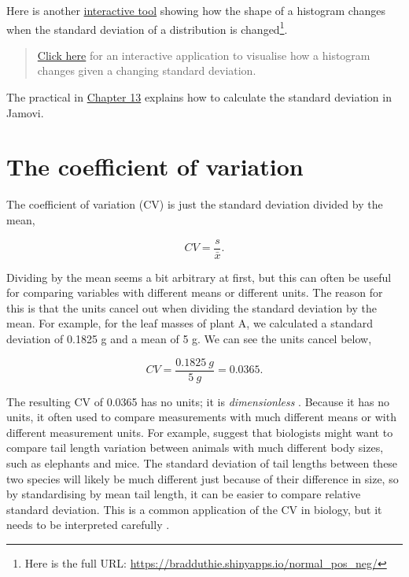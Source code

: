 \documentclass[
]{scrbook}
\begin{document}
Here is another \href{https://bradduthie.shinyapps.io/normal_pos_neg/}{interactive tool} showing how the shape of a histogram changes when the standard deviation of a distribution is changed\footnote{Here is the full URL: \url{https://bradduthie.shinyapps.io/normal_pos_neg/}}.

\begin{quote}
\href{https://bradduthie.shinyapps.io/normal_pos_neg/}{Click here} for an interactive application to visualise how a histogram changes given a changing standard deviation.
\end{quote}

The practical in \protect\hyperlink{Chapter_13}{Chapter 13} explains how to calculate the standard deviation in Jamovi.

\hypertarget{the-coefficient-of-variation}{%
\section{The coefficient of variation}\label{the-coefficient-of-variation}}

The coefficient of variation (CV) is just the standard deviation divided by the mean,

\[CV = \frac{s}{\bar{x}}.\]

Dividing by the mean seems a bit arbitrary at first, but this can often be useful for comparing variables with different means or different units.
The reason for this is that the units cancel out when dividing the standard deviation by the mean.
For example, for the leaf masses of plant A, we calculated a standard deviation of 0.1825 g and a mean of 5 g.
We can see the units cancel below,

\[CV = \frac{0.1825\:g}{5\:g} = 0.0365.\]

The resulting CV of 0.0365 has no units; it is \emph{dimensionless} \citep{Lande1977}.
Because it has no units, it often used to compare measurements with much different means or with different measurement units.
For example, \citet{Sokal1995} suggest that biologists might want to compare tail length variation between animals with much different body sizes, such as elephants and mice.
The standard deviation of tail lengths between these two species will likely be much different just because of their difference in size, so by standardising by mean tail length, it can be easier to compare relative standard deviation.
This is a common application of the CV in biology, but it needs to be interpreted carefully \citep{Pelabon2020}.
\end{document}
